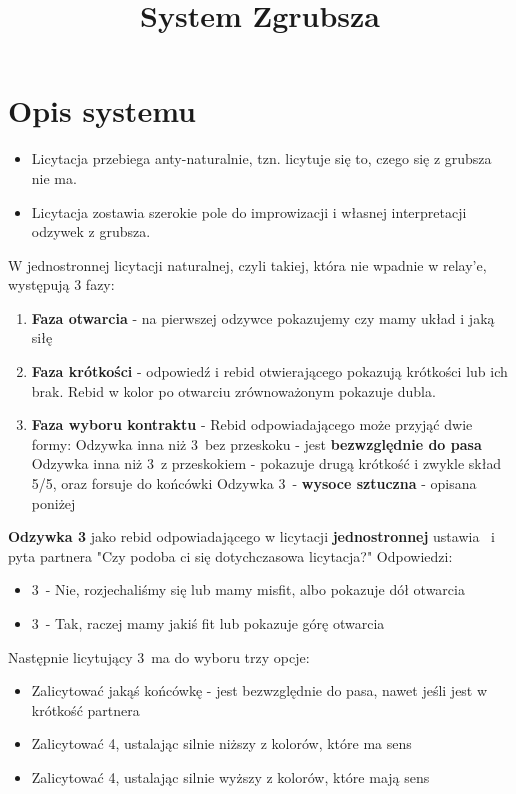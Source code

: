 \documentclass[12pt, a4paper]{article}
\title{\vspace{-2cm}System Zgrubsza}
\author{}
\date{}
\begin{document}
\section{Opis systemu}
\begin{itemize}
    \item Licytacja przebiega anty-naturalnie, tzn. licytuje się to, czego się z grubsza nie ma.
    \item Licytacja zostawia szerokie pole do improwizacji i własnej interpretacji odzywek z grubsza.
\end{itemize}
W jednostronnej licytacji naturalnej, czyli takiej, która nie wpadnie w relay'e, występują 3 fazy:
\begin{enumerate}[label=\textbf{\arabic*.}]
    \item \textbf{Faza otwarcia} - na pierwszej odzywce pokazujemy czy mamy układ i jaką siłę
    \item \textbf{Faza krótkości} - odpowiedź i rebid otwierającego pokazują krótkości lub ich brak.
    Rebid w kolor po otwarciu zrównoważonym pokazuje dubla.
    \item \textbf{Faza wyboru kontraktu} - Rebid odpowiadającego może przyjąć dwie formy:
    \subitem Odzywka inna niż 3\diams\ bez przeskoku - jest \textbf{bezwzględnie do pasa}
    \subitem Odzywka inna niż 3\diams\ z przeskokiem - pokazuje drugą krótkość i zwykle skład 5/5,
    oraz forsuje do końcówki
    \subitem Odzywka 3\diams\ - \textbf{wysoce sztuczna} - opisana poniżej
\end{enumerate}
\begin{formal}
    \textbf{Odzywka 3\diams} jako rebid odpowiadającego w licytacji \textbf{jednostronnej} ustawia \gf\ 
    i pyta partnera "Czy podoba ci się dotychczasowa licytacja?"
    Odpowiedzi:
    \begin{itemize}
        \item 3\hearts\ - Nie, rozjechaliśmy się lub mamy misfit, albo pokazuje dół otwarcia
        \item 3\spades\ - Tak, raczej mamy jakiś fit lub pokazuje górę otwarcia 
    \end{itemize}
    Następnie licytujący 3\diams\ ma do wyboru trzy opcje:
    \begin{itemize}
        \item Zalicytować jakąś końcówkę - jest bezwzględnie do pasa, nawet jeśli jest w krótkość partnera
        \item Zalicytować 4\clubs, ustalając silnie niższy z kolorów, które ma sens
        \item Zalicytować 4\diams, ustalając silnie wyższy z kolorów, które mają sens
    \end{itemize}
\end{formal}
\end{document}

